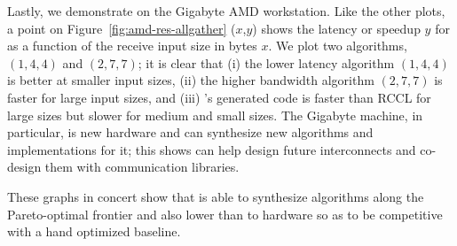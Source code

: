 Lastly, we demonstrate \allgather on the Gigabyte AMD workstation.
Like the other plots, a point on Figure~\ref{fig:amd-res-allgather}
($x$,$y$) shows the latency or speedup $y$ for \allgather as a function
of the receive input size in bytes $x$.  We plot two algorithms,
$(1,4,4)$ and $(2,7,7)$; it is clear that (i) the lower latency
algorithm $(1,4,4)$ is better at smaller input sizes, (ii) the higher
bandwidth algorithm $(2,7,7)$ is faster for large input sizes, and
(iii) \tool's generated code is faster than RCCL for large sizes but
slower for medium and small sizes. The Gigabyte machine, in
particular, is new hardware and \tool{} can synthesize new algorithms
and implementations for it; this shows \tool{} can help design future
interconnects and co-design them with communication libraries.

These graphs in concert show that \tool{} is able to synthesize
algorithms along the Pareto-optimal frontier and also lower than to
hardware so as to be competitive with a hand optimized baseline.





